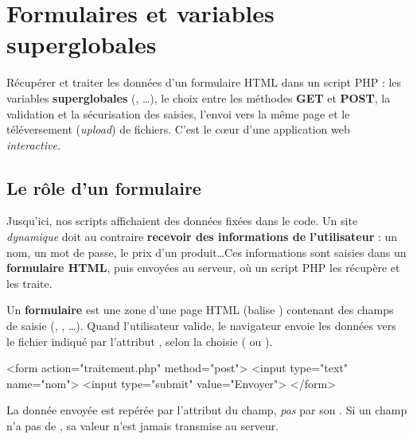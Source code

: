 \chapter{Formulaires et variables superglobales}

\begin{synthese}[Au programme]
Récupérer et traiter les données d'un formulaire HTML dans un script PHP : les
variables \textbf{superglobales} (, \dots), le choix
entre les méthodes \textbf{GET} et \textbf{POST}, la validation et la sécurisation
des saisies, l'envoi vers la même page et le téléversement (\emph{upload}) de
fichiers. C'est le c\oe ur d'une application web \emph{interactive}.
\end{synthese}

\section{Le rôle d'un formulaire}

Jusqu'ici, nos scripts affichaient des données fixées dans le code. Un site
\emph{dynamique} doit au contraire \textbf{recevoir des informations de
l'utilisateur} : un nom, un mot de passe, le prix d'un produit\dots Ces
informations sont saisies dans un \textbf{formulaire HTML}, puis envoyées au
serveur, où un script PHP les récupère et les traite.

\begin{definition}
Un \textbf{formulaire} est une zone d'une page HTML (balise )
contenant des champs de saisie (, ,
\dots). Quand l'utilisateur valide, le navigateur envoie les
données vers le fichier indiqué par l'attribut , selon la
 choisie ( ou ).
\end{definition}

\begin{codehtml}
<form action="traitement.php" method="post">
  <input type="text" name="nom">
  <input type="submit" value="Envoyer">
</form>
\end{codehtml}


\begin{attention}
La donnée envoyée est repérée par l'attribut  du champ, \emph{pas} par
son . Si un champ n'a pas de , sa valeur n'est jamais
transmise au serveur.
\end{attention}

